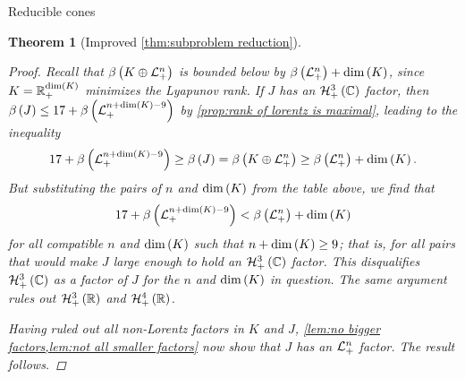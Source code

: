 \documentclass{interact}
\theoremstyle{plain}
\newtheorem{theorem}{Theorem}[section]
\theoremstyle{definition}
\theoremstyle{remark}
\begin{document}
\begin{section}{Reducible cones}
\begin{theorem}[Improved \cref{thm:subproblem reduction}]
\begin{proof}
        Recall that $\lyapunovrank{\directsum{K}{\Lnplus}}$ is bounded
        below by $\lyapunovrank{\Lnplus} + \dim\of{K}$, since $K =
        \Rnplus[\dim\of{K}]$ minimizes the Lyapunov rank. If $J$ has
        an $\Hnplus[3]\of{\Cn[1]}$ factor, then $\lyapunovrank{J} \le
        17 + \lyapunovrank{\Lnplus[n + \dim\of{K} - 9]}$ by
        \cref{prop:rank of lorentz is maximal}, leading to the
        inequality
        \begin{equation*}
          17 + \lyapunovrank{\Lnplus[n + \dim\of{K} - 9]}
          \ge
          \lyapunovrank{J}
          =
          \lyapunovrank{\directsum{K}{\Lnplus}}
          \ge
          \lyapunovrank{\Lnplus} + \dim\of{K}.
        \end{equation*}
        But substituting the pairs of $n$ and $\dim\of{K}$ from the
        table above, we find that
        \begin{equation*}
          17 + \lyapunovrank{\Lnplus[n + \dim\of{K} - 9]}
          <
          \lyapunovrank{\Lnplus} + \dim\of{K}
        \end{equation*}
        for all compatible $n$ and $\dim\of{K}$ such that $n +
        \dim\of{K} \ge 9$; that is, for all pairs that would make $J$
        large enough to hold an $\Hnplus[3]\of{\Cn[1]}$ factor. This
        disqualifies $\Hnplus[3]\of{\Cn[1]}$ as a factor of $J$ for
        the $n$ and $\dim\of{K}$ in question. The same argument rules
        out $\Hnplus[3]\of{\Rn[1]}$ and $\Hnplus[4]\of{\Rn[1]}$.

        Having ruled out all non-Lorentz factors in $K$ and $J$,
        \cref{lem:no bigger factors,lem:not all smaller factors} now
        show that $J$ has an $\Lnplus$ factor. The result follows.
      \end{proof}
    \end{theorem}


\end{section}
\end{document}
